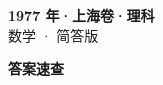 \documentclass[zihao=-4, a4paper]{ctexart}
\begin{document}
\begin{center}
  {\Large\bfseries 1977 年·上海卷·理科}\\[4pt]
  {\large 数学 · 简答版}
\end{center}
\medskip
{}

\clearpage
{}
\begin{center}{\Large\bfseries 答案速查}\end{center}
\medskip

\end{document}
